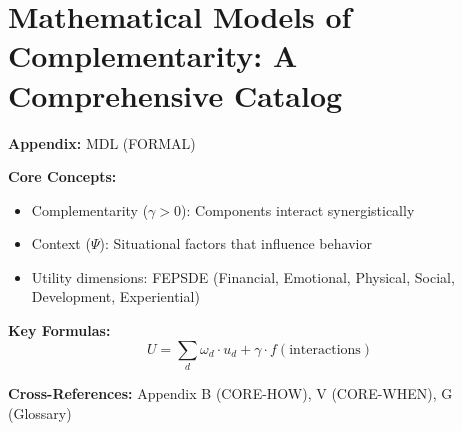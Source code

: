 
\chapter{Mathematical Models of Complementarity: A Comprehensive Catalog}
\label{app:formal-models}

\begin{abstract}
This appendix presents the key concepts and formalizations for Mathematical Models of Complementarity: A Comprehensive Catalog.
It provides theoretical foundations, practical applications, and integration
points with other components of the Evidence-Based Framework (EBF).
The content supports decision-making and behavioral analysis in the context
of complementarity and context-dependent outcomes.
\end{abstract}

\begin{tcolorbox}[colback=blue!5!white, colframe=blue!75!black,
    title=Quick Reference: Mathematical Models of Complementarity: A Comprehensive Catalog]

\textbf{Appendix:} MDL (FORMAL)

\textbf{Core Concepts:}
\begin{itemize}[nosep]
\item Complementarity ($\gamma > 0$): Components interact synergistically
\item Context ($\Psi$): Situational factors that influence behavior
\item Utility dimensions: FEPSDE (Financial, Emotional, Physical, Social, Development, Experiential)
\end{itemize}

\textbf{Key Formulas:}
\begin{equation}
U = \sum_d \omega_d \cdot u_d + \gamma \cdot f(\text{interactions})
\end{equation}

\textbf{Cross-References:} Appendix B (CORE-HOW), V (CORE-WHEN), G (Glossary)
\end{tcolorbox}





